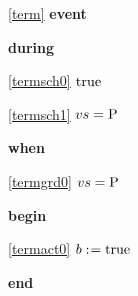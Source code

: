 \noindent \ref{term}  \textbf{event}
\begin{block}
  \item   \textbf{during}
  \begin{block}
  \item[ \eqref{termsch0} ]\sout{$\text{true} $} %
  \end{block}
  \begin{block}
  \item[ \eqref{termsch1} ]{$vs = \text{P}$} %
  \end{block}
  \item   \textbf{when}
  \begin{block}
  \item[ \eqref{termgrd0} ]{$vs = \text{P}$} %
  \end{block}
  \item   \textbf{begin}
  \begin{block}
  \item[ \eqref{termact0} ]{$b \mathrel{:\mkern1mu=} \text{true} $} %
  \end{block}
  \item   \textbf{end} \\
\end{block}
